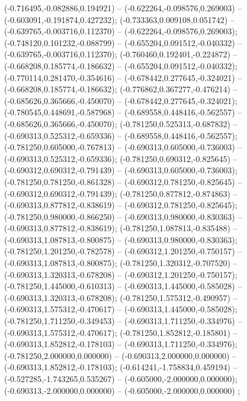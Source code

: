  (-0.716495,-0.082886,0.194921) -- (-0.622264,-0.098576,0.269003) -- (-0.603091,-0.191874,0.427232);
 (-0.733363,0.009108,0.051742) -- (-0.639765,-0.003716,0.112370) -- (-0.622264,-0.098576,0.269003);
 (-0.748120,0.101232,-0.088799) -- (-0.655204,0.091512,-0.040332) -- (-0.639765,-0.003716,0.112370);
 (-0.760460,0.192401,-0.224872) -- (-0.668208,0.185774,-0.186632) -- (-0.655204,0.091512,-0.040332);
 (-0.770114,0.281470,-0.354616) -- (-0.678442,0.277645,-0.324021) -- (-0.668208,0.185774,-0.186632);
 (-0.776862,0.367277,-0.476214) -- (-0.685626,0.365666,-0.450070) -- (-0.678442,0.277645,-0.324021);
 (-0.780545,0.448691,-0.587968) -- (-0.689558,0.448416,-0.562557) -- (-0.685626,0.365666,-0.450070);
 (-0.781250,0.525313,-0.687832) -- (-0.690313,0.525312,-0.659336) -- (-0.689558,0.448416,-0.562557);
 (-0.781250,0.605000,-0.767813) -- (-0.690313,0.605000,-0.736003) -- (-0.690313,0.525312,-0.659336);
 (-0.781250,0.690312,-0.825645) -- (-0.690312,0.690312,-0.791439) -- (-0.690313,0.605000,-0.736003);
 (-0.781250,0.781250,-0.861328) -- (-0.690312,0.781250,-0.825645) -- (-0.690312,0.690312,-0.791439);
 (-0.781250,0.877812,-0.874863) -- (-0.690313,0.877812,-0.838619) -- (-0.690312,0.781250,-0.825645);
 (-0.781250,0.980000,-0.866250) -- (-0.690313,0.980000,-0.830363) -- (-0.690313,0.877812,-0.838619);
 (-0.781250,1.087813,-0.835488) -- (-0.690313,1.087813,-0.800875) -- (-0.690313,0.980000,-0.830363);
 (-0.781250,1.201250,-0.782578) -- (-0.690312,1.201250,-0.750157) -- (-0.690313,1.087813,-0.800875);
 (-0.781250,1.320312,-0.707520) -- (-0.690313,1.320313,-0.678208) -- (-0.690312,1.201250,-0.750157);
 (-0.781250,1.445000,-0.610313) -- (-0.690313,1.445000,-0.585028) -- (-0.690313,1.320313,-0.678208);
 (-0.781250,1.575312,-0.490957) -- (-0.690313,1.575312,-0.470617) -- (-0.690313,1.445000,-0.585028);
 (-0.781250,1.711250,-0.349453) -- (-0.690313,1.711250,-0.334976) -- (-0.690313,1.575312,-0.470617);
 (-0.781250,1.852812,-0.185801) -- (-0.690313,1.852812,-0.178103) -- (-0.690313,1.711250,-0.334976);
 (-0.781250,2.000000,0.000000) -- (-0.690313,2.000000,0.000000) -- (-0.690313,1.852812,-0.178103);
 (-0.614241,-1.758834,0.459194) -- (-0.527285,-1.743265,0.535267) -- (-0.605000,-2.000000,0.000000);
 (-0.690313,-2.000000,0.000000) -- (-0.605000,-2.000000,0.000000) ;
